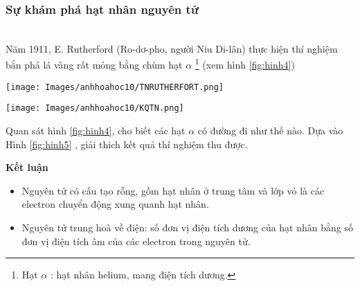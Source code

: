 \subsubsection{Sự khám phá hạt nhân nguyên tử}
\\
Năm 1911, E. Rutherford (Ro-dơ-pho, người Niu Di-lân) thực hiện thí nghiệm bắn phá lá vàng rất mỏng bằng chùm hạt $ \alpha $ \footnote{Hạt $\alpha$ : hạt nhân helium, mang điện tích dương.} (xem hình \ref{fig:hinh4})
\begin{center}
	\texttt{[image: Images/anhhoahoc10/TNRUTHERFORT.png]}\\
	\label{fig:hinh4}
\end{center}

\begin{center}
	\texttt{[image: Images/anhhoahoc10/KQTN.png]}\\
	\label{fig:hinh5}
\end{center}
%
\begin{hoivadap}
	\begin{cauhoi}
		Quan sát hình \ref{fig:hinh4}, cho biết các hạt $\alpha$ có đường đi như thế nào. Dựa vào Hình \ref{fig:hinh5} , giải thich kết quả thí nghiệm thu được.
	\end{cauhoi}
\end{hoivadap}
\begin{tomtat}
	{\bfseries{Kết luận}}
	\begin{itemize}
		\item Nguyên tử có cấu tạo rỗng, gồm hạt nhân ở trung tâm và lớp vỏ là các electron chuyển động xung quanh hạt nhân.
		\item Nguyên tử trung hoà về điện: số đơn vị điện tích dương của hạt nhân bằng số đơn vị điện tích âm của các electron trong nguyên tử.
	\end{itemize}
\end{tomtat}

